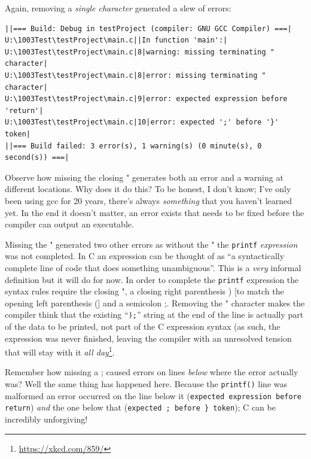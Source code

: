 \documentclass{lab}
\begin{document}
Again, removing a \textit{single character} generated a slew of errors:

\begin{lstlisting}[basicstyle=\ttfamily,caption=Errors produced by removing a \texttt{"} character.,frame=single]
||=== Build: Debug in testProject (compiler: GNU GCC Compiler) ===|
U:\1003Test\testProject\main.c||In function 'main':|
U:\1003Test\testProject\main.c|8|warning: missing terminating " character|
U:\1003Test\testProject\main.c|8|error: missing terminating " character|
U:\1003Test\testProject\main.c|9|error: expected expression before 'return'|
U:\1003Test\testProject\main.c|10|error: expected ';' before '}' token|
||=== Build failed: 3 error(s), 1 warning(s) (0 minute(s), 0 second(s)) ===|
\end{lstlisting}

Observe how missing the closing " generates both an error and a warning at different locations. Why does it do this? To be honest, I don't know; I've only been using gcc for 20 years, there's always \textit{something} that you haven't learned yet. In the end it doesn't matter, an error exists that needs to be fixed before the compiler can output an executable.

Missing the " generated two other errors as without the " the \texttt{printf} \textit{expression} was not completed. In C an expression can be thought of as ``a syntactically complete line of code that does something unambiguous''. This is a \textit{very} informal definition but it will do for now. In order to complete the \texttt{printf} expression the syntax rules require the closing ", a closing right parenthesis ) [to match the opening left parenthesis (] and a semicolon ;. Removing the " character makes the compiler think that the existing ``\texttt{);}'' string at the end of the line is actually part of the data to be printed, not part of the C expression syntax (as such, the expression was never finished, leaving the compiler with an unresolved tension that will stay with it \textit{all day}\footnote{\url{https://xkcd.com/859/}}.

Remember how missing a ; caused errors on lines \textit{below} where the error actually was? Well the same thing has happened here. Because the \texttt{printf()} line was malformed an error occurred on the line below it (\texttt{expected expression before return}) \textit{and} the one below that (\texttt{expected ; before \} token}); C can be incredibly unforgiving!

\pagebreak
\end{document}
